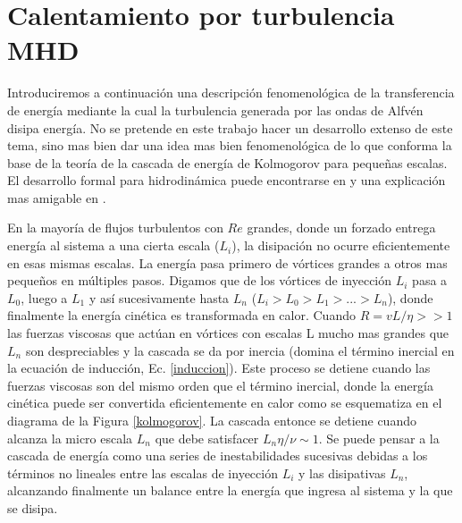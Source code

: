 \documentclass[a4paper,11pt]{report}
\begin{document}




\section{Calentamiento por turbulencia MHD} \label{turbulencia}

Introduciremos a continuación una descripción fenomenológica de la transferencia de energía mediante la cual la turbulencia generada por las ondas de Alfvén disipa energía. No se pretende en este trabajo hacer un desarrollo extenso de este tema, sino mas bien dar una idea mas bien fenomenológica de lo que conforma la base de la teoría de la cascada de energía de Kolmogorov para pequeñas escalas. El desarrollo formal para hidrodinámica puede encontrarse en \citet{kolmogorov_1941} y una explicación mas amigable en \citet{davidson_2013}.


En la mayoría de flujos turbulentos con $Re$ grandes, donde un forzado entrega energía al sistema a una cierta escala ($L_i$), la disipación no ocurre eficientemente en esas mismas escalas. La energía pasa primero de vórtices grandes a otros mas pequeños en múltiples pasos. Digamos que de los vórtices de inyección $L_i$ pasa a $L_0$, luego a $L_1$ y así sucesivamente hasta $L_n$ ($L_i>L_0>L_1>...>L_n$), donde finalmente la energía cinética es transformada en calor.
Cuando $R=vL/\eta >>1$ las fuerzas viscosas que actúan en vórtices con escalas L mucho mas grandes que $L_n$ son despreciables y la cascada se da por inercia (domina el término inercial en la ecuación de inducción, Ec. \ref{induccion}). Este proceso se detiene cuando las fuerzas viscosas son del mismo orden que el término inercial, donde la energía cinética puede ser convertida eficientemente en calor como se esquematiza en el diagrama de la Figura \ref{kolmogorov}. La cascada entonce se detiene cuando alcanza la micro escala $L_n$ que debe satisfacer $L_n \eta/ \nu \sim 1$. Se puede pensar a la cascada de energía como una series de inestabilidades sucesivas debidas a los términos no lineales entre las escalas de inyección $L_i$ y las disipativas $L_n$, alcanzando finalmente un balance entre la energía que ingresa al sistema y la que se disipa.
\end{document}
